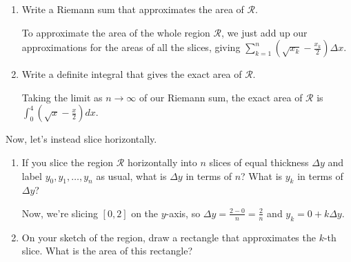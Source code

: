 \documentclass{article}
\begin{document}
\begin{enumerate}
\begin{enumerate}[resume]
  \item
    \begin{problem}[\vfill]
      Write a Riemann sum that approximates the area of $\mathcal{R}$.
    \end{problem}

    \begin{solution}
      To approximate the area of the whole region $\mathcal{R}$, we just
      add up our approximations for the areas of all the slices, giving
      $\boxed{\sum_{k=1}^n \left( \sqrt{x_k} - \frac{x_k}{2} \right)
        \Delta x}$.
    \end{solution}

  \item
\begin{problem}[\vfill\newpage]
      Write a definite integral that gives the exact area of
      $\mathcal{R}$. 
    \end{problem}

    \begin{solution}
      Taking the limit as $n \to \infty$ of our Riemann sum, the exact
      area of $\mathcal{R}$ is $\boxed{\int_0^4 \left( \sqrt{x} -
          \frac{x}{2} \right) dx}$. 
    \end{solution}

  \end{enumerate}

  Now, let's instead slice horizontally.
  \begin{enumerate}[resume]
  \item
    \begin{problem}[\vfill]
      If you slice the region $\mathcal{R}$ horizontally into $n$ slices
      of equal thickness $\Delta y$ and label $y_0, y_1, \ldots, y_n$ as
      usual, what is $\Delta y$ in terms of $n$?  What is $y_k$ in terms
      of $\Delta y$?
    \end{problem}

    \begin{solution}
      Now, we're slicing $[0, 2]$ on the $y$-axis, so $\Delta y = \frac{2
        - 0}{n} = \frac{2}{n}$ and $y_k = 0 + k \Delta y$.
    \end{solution}

  \item
    \begin{problem}[\vfill]
      On your sketch of the region, draw a rectangle that approximates the
      $k$-th slice.  What is the area of this rectangle?
    \end{problem}


\end{enumerate}
\end{enumerate}
\end{document}
